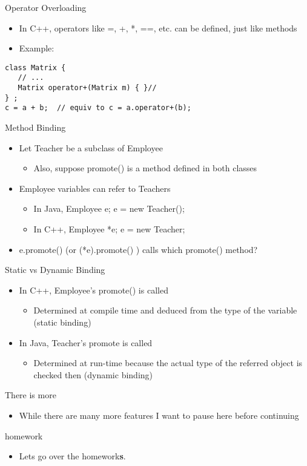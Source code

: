 \documentclass{beamer}
\begin{document}
\begin{frame}[fragile]{Operator Overloading}
\begin{itemize}
\item In C++, operators like =, +, *, ==, etc. can be defined, just like methods
\item Example:
\end{itemize}
\begin{lstlisting}
class Matrix {
   // ...
   Matrix operator+(Matrix m) { }//
} ;
c = a + b;  // equiv to c = a.operator+(b);
\end{lstlisting}
\end{frame}

\begin{frame}{Method Binding}
\begin{itemize}
\item Let Teacher be a subclass of Employee \\
\begin{itemize}
\item Also, suppose promote() is a method defined in both classes
\end{itemize}
\item Employee variables can refer to Teachers
\begin{itemize}
\item In Java, Employee e; e = new Teacher();
\item In C++, Employee *e; e = new Teacher;
\end{itemize}
\item e.promote() (or (*e).promote() ) calls which promote() method?
\end{itemize}
\end{frame}

\begin{frame}{Static vs Dynamic Binding}
\begin{itemize}
\item In C++, Employee's promote() is called
\begin{itemize}
\item Determined at compile time and deduced from the type of the variable (static binding)
\end{itemize}
\item In Java, Teacher's promote is called
\begin{itemize}
\item Determined at run-time because the actual type of the referred object is checked then (dynamic binding)
\end{itemize}
\end{itemize}
\end{frame}

\begin{frame}{There is more}
\begin{itemize}
\item While there are many more features I want to pause here before continuing
\end{itemize}
\end{frame}


\begin{frame}{homework}
\begin{itemize}
\item Lets go over the homework\textbf{s}.
\end{itemize}
\end{frame}
\end{document}
